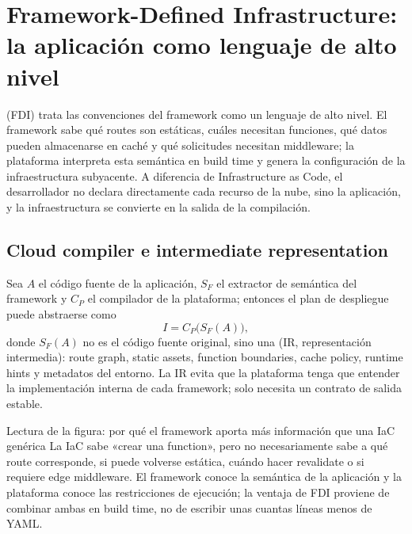 \section{Framework-Defined Infrastructure: la aplicación como lenguaje de alto nivel}

 (FDI) trata las convenciones del framework como un lenguaje de alto nivel. El framework sabe qué routes son estáticas, cuáles necesitan funciones, qué datos pueden almacenarse en caché y qué solicitudes necesitan middleware; la plataforma interpreta esta semántica en build time y genera la configuración de la infraestructura subyacente. A diferencia de Infrastructure as Code, el desarrollador no declara directamente cada recurso de la nube, sino la aplicación, y la infraestructura se convierte en la salida de la compilación.

\subsection{Cloud compiler e intermediate representation}

Sea $A$ el código fuente de la aplicación, $S_F$ el extractor de semántica del framework y $C_P$ el compilador de la plataforma; entonces el plan de despliegue puede abstraerse como
\[
I=C_P\bigl(S_F(A)\bigr),
\]
donde $S_F(A)$ no es el código fuente original, sino una  (IR, representación intermedia): route graph, static assets, function boundaries, cache policy, runtime hints y metadatos del entorno. La IR evita que la plataforma tenga que entender la implementación interna de cada framework; solo necesita un contrato de salida estable.


\begin{knowledgebox}{Lectura de la figura: por qué el framework aporta más información que una IaC genérica}
La IaC sabe «crear una function», pero no necesariamente sabe a qué route corresponde, si puede volverse estática, cuándo hacer revalidate o si requiere edge middleware. El framework conoce la semántica de la aplicación y la plataforma conoce las restricciones de ejecución; la ventaja de FDI proviene de combinar ambas en build time, no de escribir unas cuantas líneas menos de YAML.
\end{knowledgebox}

